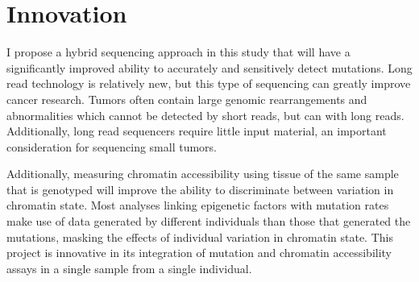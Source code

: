 % 






\section{Innovation}

I propose a hybrid sequencing approach in this study that will have a significantly improved ability to accurately and sensitively detect mutations. Long read technology is relatively new, but this type of sequencing can greatly improve cancer research. Tumors often contain large genomic rearrangements and abnormalities which cannot be detected by short reads, but can with long reads. Additionally, long read sequencers require little input material, an important consideration for sequencing small tumors.

Additionally, measuring chromatin accessibility using tissue of the same sample that is genotyped will improve the ability to discriminate between variation in chromatin state.
Most analyses linking epigenetic factors with mutation rates make use of data generated by different individuals than those that generated the mutations, masking the effects of individual variation in chromatin state. This project is innovative in its integration of mutation and chromatin accessibility assays in a single sample from a single individual.



